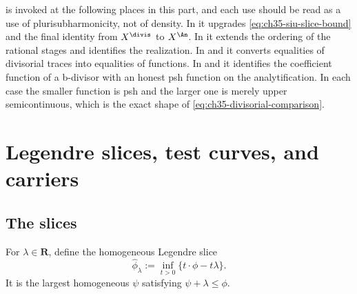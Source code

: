 \begin{remark}
\label{rem:ch35-determination-uses}
 is invoked at the following places in
this part, and each use should be read as a use of
plurisubharmonicity, not of density.  In
 it upgrades
\eqref{eq:ch35-siu-slice-bound} and the final identity from
$X^{\divis}$ to $X^{\An}$.  In
 it extends the ordering of the
rational stages and identifies the realization.  In
 and
 it converts equalities of divisorial traces
into equalities of functions.  In
 and
 it identifies the coefficient
function of a b-divisor with an honest psh function on the analytification.
In each case the smaller function is psh and the larger one is merely upper
semicontinuous, which is the exact shape of
\eqref{eq:ch35-divisorial-comparison}.
\end{remark}

\section{Legendre slices, test curves, and carriers}
\label{sec:ch35-legendre}

\subsection{The slices}
\label{sec:ch35-slices}

For $\lambda\in\mathbf R$, define the homogeneous Legendre slice
\begin{equation}
\label{eq:homogeneous-legendre-slice}
 \widehat\phi_\lambda
   :=\inf_{t>0}\{t\cdot\phi-t\lambda\}.
\end{equation}
It is the largest homogeneous $\psi$ satisfying
$\psi+\lambda\leq\phi$.

